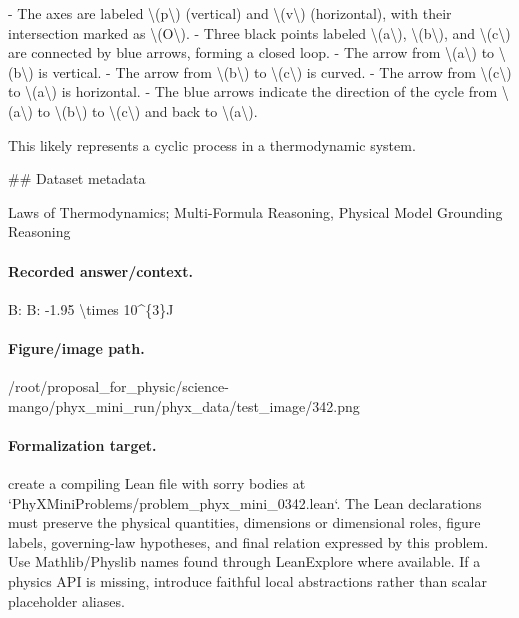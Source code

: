 - The axes are labeled \textbackslash{}(p\textbackslash{}) (vertical) and \textbackslash{}(v\textbackslash{}) (horizontal), with their intersection marked as \textbackslash{}(O\textbackslash{}).
- Three black points labeled \textbackslash{}(a\textbackslash{}), \textbackslash{}(b\textbackslash{}), and \textbackslash{}(c\textbackslash{}) are connected by blue arrows, forming a closed loop.
  - The arrow from \textbackslash{}(a\textbackslash{}) to \textbackslash{}(b\textbackslash{}) is vertical.
  - The arrow from \textbackslash{}(b\textbackslash{}) to \textbackslash{}(c\textbackslash{}) is curved.
  - The arrow from \textbackslash{}(c\textbackslash{}) to \textbackslash{}(a\textbackslash{}) is horizontal.
- The blue arrows indicate the direction of the cycle from \textbackslash{}(a\textbackslash{}) to \textbackslash{}(b\textbackslash{}) to \textbackslash{}(c\textbackslash{}) and back to \textbackslash{}(a\textbackslash{}).

This likely represents a cyclic process in a thermodynamic system.

\#\# Dataset metadata

Laws of Thermodynamics; Multi-Formula Reasoning, Physical Model Grounding Reasoning

\paragraph{Recorded answer/context.}
B: B: -1.95 \textbackslash{}times 10\textasciicircum{}\{3\}J

\paragraph{Figure/image path.}
/root/proposal\_for\_physic/science-mango/phyx\_mini\_run/phyx\_data/test\_image/342.png

\paragraph{Formalization target.}
create a compiling Lean file with sorry bodies at `PhyXMiniProblems/problem\_phyx\_mini\_0342.lean`. The Lean declarations must preserve the physical quantities, dimensions or dimensional roles, figure labels, governing-law hypotheses, and final relation expressed by this problem.
Use Mathlib/Physlib names found through LeanExplore where available. If a physics API is missing, introduce faithful local abstractions rather than scalar placeholder aliases.

